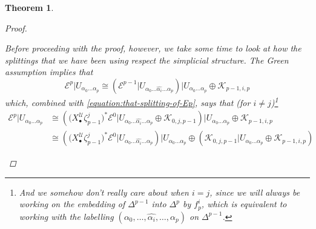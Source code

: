\documentclass[11pt,fleqn]{article}
\theoremstyle{plain}
\newtheorem{theorem}{Theorem}[subsection]
\theoremstyle{definition}
\theoremstyle{remark}
\numberwithin{equation}{theorem}
\newcommand{\cover}{\mathcal{U}}
\newcommand{\restricted}{\mathbin{\big\vert}}
\newcommand{\nerve}[1]{X_{#1}^\cover}
\begin{document}
\begin{theorem}
\begin{proof}
\begin{enumerate}
                        Before proceeding with the proof, however, we take some time to look at how the splittings that we have been using respect the simplicial structure.
                        The Gre{}en assumption implies that
                        \begin{equation}
                        \label{equation:Ep-decomposed-into-Ep-1}
                            \mathcal{E}^p \restricted U_{\alpha_0\ldots\alpha_p}
                            \cong
                            \left(
                                \mathcal{E}^{p-1} \restricted U_{\alpha_0\ldots\widehat{\alpha_i}\ldots\alpha_p}
                            \right) \restricted U_{\alpha_0\ldots\alpha_p}
                            \oplus
                            \mathcal{K}_{p-1,i,p}
                        \end{equation}
                        which, combined with \cref{equation:that-splitting-of-Ep}, says that (for $i\neq j$)\footnote{And we somehow don't really care about when $i=j$, since we will always be working on the embedding of $\Delta^{p-1}$ into $\Delta^p$ by $f_p^i$, which is equivalent to working with the labelling $(\alpha_0,\ldots,\widehat{\alpha_i},\ldots,\alpha_p)$ on $\Delta^{p-1}$.}
                        \begin{align*}
                            \mathcal{E}^p \restricted U_{\alpha_0\ldots\alpha_p}
                            &\cong
                            \left(
                                \big(\nerve{\bullet}\zeta_{p-1}^j\big)^* \mathcal{E}^0 \restricted U_{\alpha_0\ldots\widehat{\alpha_i}\ldots\alpha_p}
                                \oplus
                                \mathcal{K}_{0,j,p-1}
                            \right) \restricted U_{\alpha_0\ldots\alpha_p}
                            \oplus
                            \mathcal{K}_{p-1,i,p}\\
                            &\cong
                            \left(
                                \big(\nerve{\bullet}\zeta_{p-1}^j\big)^* \mathcal{E}^0 \restricted U_{\alpha_0\ldots\widehat{\alpha_i}\ldots\alpha_p}
                            \right) \restricted U_{\alpha_0\ldots\alpha_p}
                            \oplus
                            \left(
                                \mathcal{K}_{0,j,p-1} \restricted U_{\alpha_0\ldots\alpha_p}
                                \oplus
                                \mathcal{K}_{p-1,i,p}
                            \right)
                        \end{align*}

\end{enumerate}
\end{proof}
\end{theorem}
\end{document}
